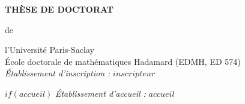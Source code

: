 \documentclass[a4paper,12pt]{reedthesis}
\begin{document}
\begin{center}
{\Large\bf THÈSE DE DOCTORAT}
\end{center}
\begin{center}
{de }
\end{center}
\begin{center}
 {\Large\sc l'Université Paris-Saclay}\\
  \vspace*{0.4cm}
École doctorale de mathématiques Hadamard (EDMH, ED 574)\\
 \vspace*{0.4cm}
{\small \it Établissement d'inscription : }
$inscripteur$

 \vspace*{0.2cm}
$if(accueil)$
{\small \it \'Etablissement d'accueil : }
$accueil$


\end{center}
\end{document}
